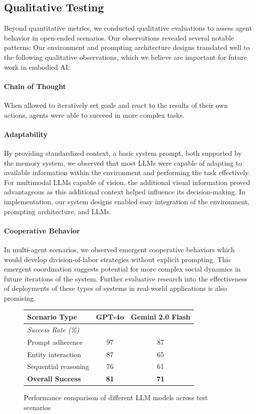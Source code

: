 \documentclass{article}
\begin{document}
\subsection{Qualitative Testing}
Beyond quantitative metrics, we conducted qualitative evaluations to assess agent behavior in open-ended scenarios. Our observations revealed several notable patterns:
Our environment and prompting architecture designs translated well to the following qualitative observations, which we believe are important for future work in embodied AI:
\paragraph{Chain of Thought} When allowed to iteratively set goals and react to the results of their own actions, agents were able to succeed in more complex tasks.
\paragraph{Adaptability} By providing standardized context, a basic system prompt, both supported by the memory system, we observed that most LLMs were capable of adapting to available information within the environment and performing the task effectively.
For multimodal LLMs capable of vision, the additional visual information proved advantageous as this additional context helped influence its decision-making.
In implementation, our system designs enabled easy integration of the environment, prompting architecture, and LLMs.

\paragraph{Cooperative Behavior} In multi-agent scenarios, we observed emergent cooperative behaviors which would develop division-of-labor strategies without explicit prompting.
This emergent coordination suggests potential for more complex social dynamics in future iterations of the system.
Further evaluative research into the effectiveness of deployments of these types of systems in real-world applications is also promising.
\begin{figure}
    \centering
    \small
    \begin{tabular}{lcc}
        \toprule
        \textbf{Scenario Type} & \textbf{GPT-4o} & \textbf{Gemini 2.0 Flash} \\
        \midrule
        \multicolumn{3}{l}{\textit{Success Rate (\%)}} \\
        Prompt adherence        & 97 & 87 \\
        Entity interaction      & 87 & 65 \\
        Sequential reasoning    & 76 & 61 \\
        \midrule
        \textbf{Overall Success} & \textbf{81} & \textbf{71} \\
        \bottomrule
    \end{tabular}
    \caption{Performance comparison of different LLM models across test scenarios} 
    \label{tab:model-performance}
\end{figure}
\end{document}
